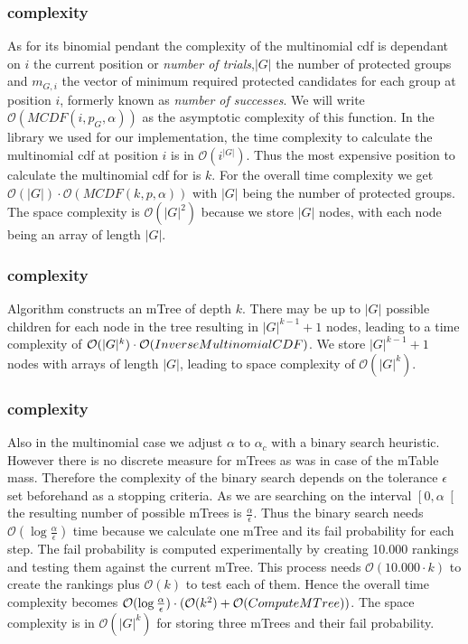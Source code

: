 %
\subsubsection{\algoImcdf complexity}\label{subsubsec:imcdf-complexity}
As for its binomial pendant the complexity of the multinomial cdf is dependant on $i$ the current position or \textit{number of trials},$|G|$ the number of protected groups and $m_{G,i}$ the vector of minimum required protected candidates for each group at position $i$, formerly known as \textit{number of successes}.
%
We will write $\mathcal{O}(MCDF(i,p_G,\alpha))$ as the asymptotic complexity of this function. In the library we used for our implementation, the time complexity to calculate the multinomial cdf at position $i$ is in $\mathcal{O}(i^{|G|})$. Thus the most expensive position to calculate the multinomial cdf for is $k$.
%
For the overall time complexity we get $\mathcal{O}(|G|) \cdot \mathcal{O}(MCDF(k,p,\alpha ))$ with $|G|$ being the number of protected groups.
%
The space complexity is $\mathcal{O}(|G|^2)$ because we store $|G|$ nodes, with each node being an array of length $|G|$.
%
\subsubsection{\algoComputeMTree complexity}\label{subsubsec:mtree-complexity}
Algorithm \algoComputeMTree constructs an mTree of depth $k$.
%
There may be up to $|G|$ possible children for each node in the tree resulting in $|G|^{k-1} +1$ nodes, leading to a time complexity of $\mathcal{O}(|G|^{k}) \cdot \mathcal{O}({\sc InverseMultinomialCDF})$.
%
We store $|G|^{k-1} +1$ nodes with arrays of length $|G|$, leading to space complexity of $\mathcal{O}(|G|^{k})$.
%
\subsubsection{\algoMultBinary complexity}\label{subsubsec:multBinary-complexity}
Also in the multinomial case we adjust $\alpha$ to $\alpha_c$ with a binary search heuristic.
%
However there is no discrete measure for mTrees as was in case of the mTable mass.
%
Therefore the complexity of the binary search depends on the tolerance $\epsilon$ set beforehand as a stopping criteria.
%
As we are searching on the interval $\left[0,\alpha\right[$ the resulting number of possible mTrees is $\frac{\alpha}{\epsilon}$.
%
Thus the binary search needs $\mathcal{O}(\log{}\frac{\alpha}{\epsilon})$ time because we calculate one mTree and its fail probability for each step.
%
The fail probability is computed experimentally by creating 10.000 rankings and testing them against the current mTree.
%
This process needs $\mathcal{O}(10.000 \cdot k)$ to create the rankings plus $\mathcal{O}(k)$ to test each of them.
%
Hence the overall time complexity becomes $\mathcal{O}(\log{}\frac{\alpha}{\epsilon}) \cdot (\mathcal{O}(k^2) + \mathcal{O}({\sc ComputeMTree}))$.
%
The space complexity is in $\mathcal{O}(|G|^k)$ for storing three mTrees and their fail probability.
%
